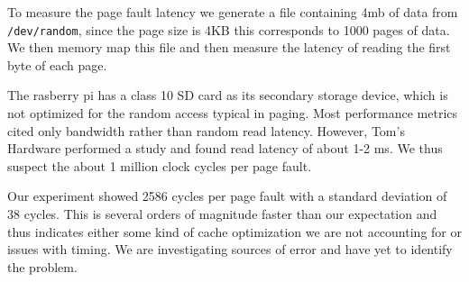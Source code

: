 To measure the page fault latency we generate a file containing 4mb of data from {\tt /dev/random}, since the page size is 4KB this corresponds to 1000 pages of data.  
We then memory map this file and then measure the latency of reading the first byte of each page.  

The rasberry pi has a class 10 SD card as its secondary storage device, which is not optimized for the random access typical in paging.  Most performance metrics cited only bandwidth rather than random read latency.  
However, Tom's Hardware \cite{sdcard} performed a study and found read latency of about 1-2 ms.
We thus suspect the about 1 million clock cycles per page fault.  

Our experiment showed 2586 cycles per page fault with a standard deviation of 38 cycles.  This is several orders of magnitude faster than our expectation and thus indicates either some kind of cache optimization we are not accounting for or issues with timing.  We are investigating sources of error and have yet to identify the problem.